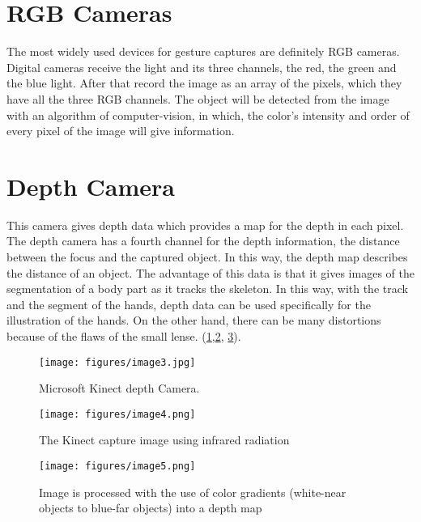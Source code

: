\documentclass[12pt]{book}
\begin{document}
\section{RGB Cameras}\label{s:sec9}
The most widely used devices for gesture captures are definitely RGB cameras. Digital cameras receive the light and its three channels, the red, the green and the blue light. After that  record the image as an array of the pixels, which they have all the three RGB channels. The object will be detected from the image with an algorithm of computer-vision, in which, the color’s intensity and order of every pixel of the image will give information.


\section{Depth Camera}\label{s:sec10}
This camera gives depth data which provides a map for the depth in each pixel. The depth camera has a fourth channel for the depth information, the distance between the focus and the captured object. In this way, the depth map describes the distance of an object. The advantage of this data is that it gives images of the segmentation of a body part as it tracks the skeleton. In this way, with the  track and the segment of the hands, depth data can be used specifically for the illustration of the hands. On the other hand, there can be many distortions because of the flaws of the small lense.
(\ref{fig:fig3},\ref{fig:fig4}, \ref{fig:fig5}).

\begin{figure}[!htbp]
	\centering
	\texttt{[image: figures/image3.jpg]}
	\\
	\caption{Microsoft Kinect depth Camera.}
	\label{fig:fig3}
\end{figure} 

\begin{figure}[!htbp]
\centering
  \texttt{[image: figures/image4.png]}
  \\
  \caption{The Kinect capture image using infrared radiation}
  \label{fig:fig4}
\end{figure}

\begin{figure}[!htbp]
\centering
  \texttt{[image: figures/image5.png]}
  \\
  \caption{Image is processed with the use of color gradients (white-near objects to blue-far objects) into a depth map}
  \label{fig:fig5}
\end{figure}
\end{document}
